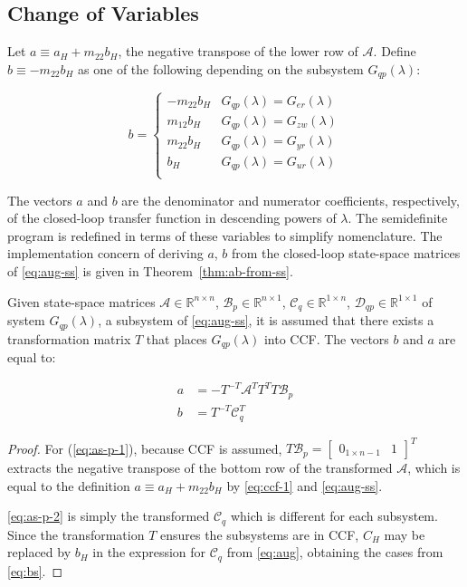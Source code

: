 \subsection{Change of Variables} \label{sec:opt-cv}

Let ${a \equiv a_H + m_{22}b_H}$, the negative transpose of the lower row of $\mathcal{A}$. Define ${b \equiv -m_{22}b_H}$ as one of the following depending on the subsystem $G_{qp}(\lambda)$:

\begin{equation}
	b =
	\begin{cases}
		-m_{22}b_H & G_{qp}(\lambda) = G_{er}(\lambda) \\
		m_{12}b_H & G_{qp}(\lambda) = G_{zw}(\lambda) \\
		m_{22}b_H & G_{qp}(\lambda) = G_{yr}(\lambda) \\
		b_H & G_{qp}(\lambda) = G_{ur}(\lambda) \\
	\end{cases} \label{eq:bs}
\end{equation}

The vectors $a$ and $b$ are the denominator and numerator coefficients, respectively, of the closed-loop transfer function in descending powers of $\lambda$. The semidefinite program is redefined in terms of these variables to simplify nomenclature. The implementation concern of deriving $a$, $b$ from the closed-loop state-space matrices of \autoref{eq:aug-ss} is given in Theorem~\ref{thm:ab-from-ss}.

\begin{thm} \label{thm:ab-from-ss}
	Given state-space matrices $\mathcal{A} \in \mathbb{R}^{n \times n}$, $\mathcal{B}_p \in \mathbb{R}^{n \times 1}$, $\mathcal{C}_q \in \mathbb{R}^{1 \times n}$, $\mathcal{D}_{qp} \in \mathbb{R}^{1 \times 1}$ of system $G_{qp}(\lambda)$, a subsystem of \autoref{eq:aug-ss}, it is assumed that there exists a transformation matrix $T$ that places $G_{qp}(\lambda)$ into \gls{CCF}. The vectors $b$ and $a$ are equal to:
	
	\begin{align}
		a &= -T^{-T}\mathcal{A}^TT^TT\mathcal{B}_p \label{eq:as-p-1} \\
		b &= T^{-T}\mathcal{C}_q^T \label{eq:as-p-2}
	\end{align}
\end{thm}

\begin{proof}
	For (\ref{eq:as-p-1}), because \gls{CCF} is assumed, ${T\mathcal{B}_p = \begin{bmatrix} 0_{1 \times n-1} & 1 \end{bmatrix}^T}$ extracts the negative transpose of the bottom row of the transformed $\mathcal{A}$, which is equal to the definition $a \equiv a_H + m_{22}b_H$ by \autoref{eq:ccf-1} and \autoref{eq:aug-ss}.
	
	\autoref{eq:as-p-2} is simply the transformed $\mathcal{C}_q$ which is different for each subsystem. Since the transformation $T$ ensures the subsystems are in \gls{CCF}, $C_H$ may be replaced by $b_H$ in the expression for $\mathcal{C}_q$ from \autoref{eq:aug}, obtaining the cases from \autoref{eq:bs}.
\end{proof}

